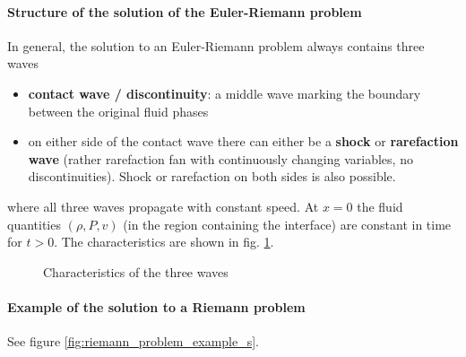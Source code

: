 \paragraph*{Structure of the solution of the Euler-Riemann problem}
In general, the solution to an Euler-Riemann problem always contains three waves
\begin{itemize}
    \item \textbf{contact wave / discontinuity}: a middle wave marking the boundary between the original fluid phases
    \item on either side of the contact wave there can either be a \textbf{shock} or \textbf{rarefaction wave} (rather rarefaction fan with continuously changing variables, no discontinuities). Shock or rarefaction on both sides is also possible.
\end{itemize}
where all three waves propagate with constant speed. At \textcolor{blue1}{$x=0$ the fluid quantities} $(\rho,P,v)$ (in the region containing the interface) \textcolor{blue1}{are constant in time} for $t>0$.
The characteristics are shown in fig. \ref{fig:riemann_problem_characteristics_s}.
\begin{figure}[htb!]
    \centering
    
    \caption{Characteristics of the three waves}
    \label{fig:riemann_problem_characteristics_s}
\end{figure}
\paragraph*{Example of the solution to a Riemann problem} See figure \ref{fig:riemann_problem_example_s}.

